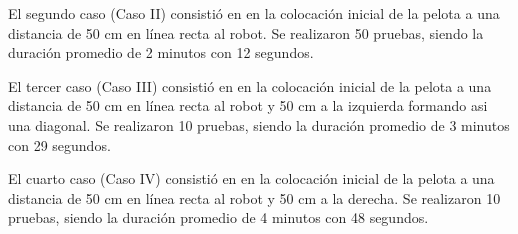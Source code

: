
El segundo caso (Caso II) consistió en en la colocación inicial de la pelota a una distancia de 50 cm en línea recta al robot. Se realizaron 50 pruebas, siendo la duración promedio de 2 minutos con 12 segundos.


El tercer caso  (Caso III) consistió en en la colocación inicial de la pelota a una distancia de 50 cm en línea recta al robot y 50 cm a la izquierda formando asi una diagonal. Se realizaron 10 pruebas, siendo la duración promedio de 3 minutos con 29 segundos. 


El cuarto caso (Caso IV) consistió en en la colocación inicial de la pelota a una distancia de 50 cm en línea recta al robot y 50 cm a la derecha. Se realizaron 10 pruebas, siendo la duración promedio de 4 minutos con 48 segundos. 

